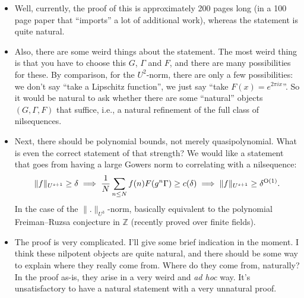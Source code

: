 \documentclass[reqno]{amsart} 
\numberwithin{theorem}{section}
\numberwithin{equation}{section}
\begin{document}
\begin{itemize}
\item Well, currently, the proof of this is approximately 200 pages long (in a 100 page paper that ``imports'' a lot of additional work), whereas the statement is quite natural.
\item Also, there are some weird things about the statement.  The most weird thing is that you have to choose this $G$, $\Gamma$ and $F$, and there are many possibilities for these.  By comparison, for the $U^2$-norm, there are only a few possibilities: we don't say ``take a Lipschitz function'', we just say ``take $F(x) = e^{2 \pi i x}$''.  So it would be natural to ask whether there are some ``natural'' objects $(G, \Gamma, F)$ that suffice, i.e., a natural refinement of the full class of nilsequences.
\item Next, there should be polynomial bounds, not merely quasipolynomial.  What is even the correct statement of that strength?  We would like a statement that goes from having a large Gowers norm to correlating with a nilsequence:
  \begin{equation*}
    \lVert f \rVert_{U^{s + 1}} \geq \delta \implies \frac{1}{N} \sum_{n \leq N} f(n) F(g^n \Gamma) \geq c(\delta)
    \implies \lVert f \rVert_{U^{s + 1}} \geq \delta^{\operatorname{O}(1)}.
  \end{equation*}
  In the case of the $\lVert . \rVert_{U^3}$-norm, basically equivalent to the polynomial Freiman--Ruzsa conjecture in $\mathbb{Z}$ (recently proved over finite fields).
\item The proof is very complicated.  I'll give some brief indication in the moment.  I think these nilpotent objects are quite natural, and there should be some way to explain where they really come from.  Where do they come from, naturally?  In the proof as-is, they arise in a very weird and \emph{ad hoc} way.  It's unsatisfactory to have a natural statement with a very unnatural proof.
\end{itemize}
\end{document}
